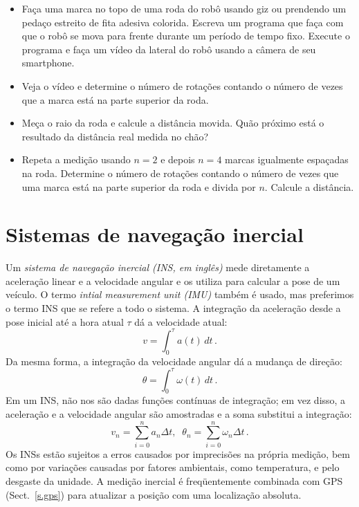 \begin{framed}
\begin{itemize}
\item Faça uma marca no topo de uma roda do robô usando giz ou prendendo um pedaço estreito de fita adesiva colorida. Escreva um programa que faça com que o robô se mova para frente durante um período de tempo fixo. Execute o programa e faça um vídeo da lateral do robô usando a câmera de seu smartphone.
\item Veja o vídeo e determine o número de rotações contando o número de vezes que a marca está na parte superior da roda.
\item Meça o raio da roda e calcule a distância movida. Quão próximo está o resultado da distância real medida no chão?
\item Repeta a medição usando $n=2$ e depois $n=4$ marcas igualmente espaçadas na roda. Determine o número de rotações contando o número de vezes que uma marca está na parte superior da roda e divida por $n$. Calcule a distância.
\end{itemize}
\end{framed}














\section{Sistemas de navegação inercial}\label{s.imu}

Um \emph{sistema de navegação inercial (INS, em inglês)} mede diretamente a aceleração linear e a velocidade angular e os utiliza para calcular a pose de um veículo. O termo \emph{intial measurement unit (IMU)} também é usado, mas preferimos o termo INS que se refere a todo o sistema. A integração da aceleração desde a pose inicial até a hora atual $\tau$ dá a velocidade atual:
\[
v=\int_0^\tau a(t) \,dt\,.
\]
Da mesma forma, a integração da velocidade angular dá a mudança de direção:
\[
\theta = \int_0^\tau \omega(t) \, dt\,.
\]
Em um INS, não nos são dadas funções contínuas de integração; em vez disso, a aceleração e a velocidade angular são amostradas e a soma substitui a integração:
\[
v_n = \sum^{n}_{i=0} a_n \Delta t,\;\; \theta_n = \sum^{n}_{i=0} \omega_n \Delta t\,.
\]
Os INSs estão sujeitos a erros causados por imprecisões na própria medição, bem como por variações causadas por fatores ambientais, como temperatura, e pelo desgaste da unidade. A medição inercial é freqüentemente combinada com GPS (Sect.~\ref{s.gps}) para atualizar a posição com uma localização absoluta.

